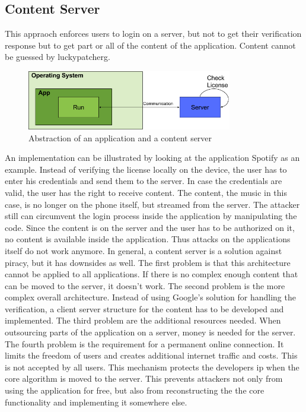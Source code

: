 \subsection{Content Server} \label{section:counter-replace-server}
This appraoch enforces users to login on a server, but not to get their verification response but to get part or all of the content of the application.
Content cannot be guessed by \gls{luckypatcherg}.
\newline
\begin{figure}[h]
    \centering
    \includegraphics[width=0.8\textwidth]{data/contentServer.png}
    \caption{Abstraction of an application and a content server}
    \label{fig:contentServer}
\end{figure}
An implementation can be illustrated by looking at the application Spotify \cite{spotify} as an example.
Instead of verifying the license locally on the device, the user has to enter his credentials and send them to the server.
In case the credentials are valid, the user has the right to receive content.
The content, the music in this case, is no longer on the phone itself, but streamed from the server.
The attacker still can circumvent the login process inside the application by manipulating the code.
Since the content is on the server and the user has to be authorized on it, no content is available inside the application.
Thus attacks on the applications itself do not work anymore.
\newline
\newline
In general, a content server is a solution against piracy, but it has downsides as well.
The first problem is that this architecture cannot be applied to all applications.
If there is no complex enough content that can be moved to the server, it doesn't work.
\newline
The second problem is the more complex overall architecture.
Instead of using Google’s solution for handling the verification, a client server structure for the content has to be developed and implemented.
\newline
The third problem are the additional resources needed.
When outsourcing parts of the application on a server, money is needed for the server.
\newline
The fourth problem is the requirement for a permanent online connection.
It limits the freedom of users and creates additional internet traffic and costs.
This is not accepted by all users.
\newline
\newline
This mechanism protects the developers \gls{ip} when the core algorithm is moved to the server.
This prevents attackers not only from using the application for free, but also from reconstructing the the core functionality and implementing it somewhere else.
